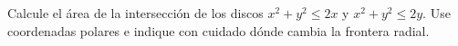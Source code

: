 Calcule el área de la intersección de los discos $x^2+y^2\leq2x$ y $x^2+y^2\leq2y$. Use coordenadas polares e indique con cuidado dónde cambia la frontera radial.

